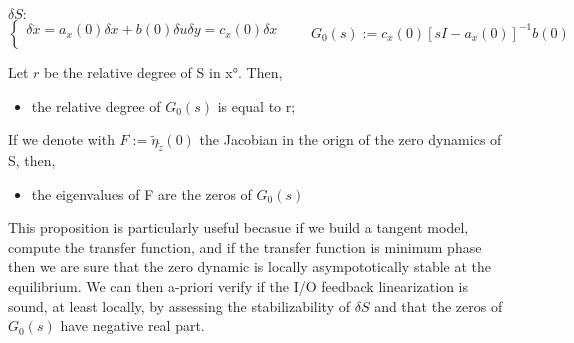 $\delta S:$\begin{equation*}
	\left\{
	\begin{array}{ll}	
		\delta \dot{x}=a_x(0)\delta x+b(0)\delta u
		\delta y=c_x(0)\delta x\\
	\end{array}
	\right. \qquad G_0(s):=c_x(0)[sI-a_x(0)]^{-1}b(0)
\end{equation*}
\begin{prop}
 Let $r$ be the relative degree of S in x°. Then,
 \begin{itemize}
 	\item the relative degree of $G_0(s)$ is equal to r;
 \end{itemize}
If we denote with $F:=\tilde{\eta}_{\tilde{z}}(0)$ the Jacobian in the orign of the zero dynamics of S, then, 
\begin{itemize}
	\item the eigenvalues of F are the zeros of $G_0(s)$
\end{itemize}
\end{prop}
 This proposition is particularly useful becasue if we build a tangent model, compute the transfer function, and if the transfer function is minimum phase then we are sure that the zero dynamic is locally asympototically stable at the equilibrium. 
 We can then a-priori verify if the I/O feedback linearization is sound, at least locally, by assessing the stabilizability of $\delta S$ and that the zeros of $G_0(s)$ have negative real part.
